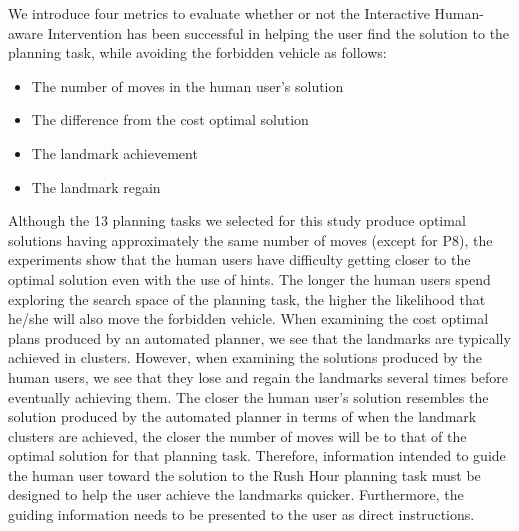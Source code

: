 We introduce four metrics to evaluate whether or not the Interactive Human-aware Intervention has been successful in helping the user find the solution to the planning task, while avoiding the forbidden vehicle as follows:
\begin{itemize}
\item The number of moves in the human user's solution
\item The difference from the cost optimal solution
\item The landmark achievement
\item The landmark regain
\end{itemize}
Although the 13 planning tasks we selected for this study produce optimal solutions having approximately the same number of moves (except for P8), the experiments show that the human users have difficulty getting closer to the optimal solution even with the use of hints.
The longer the human users spend exploring the search space of the planning task, the higher the likelihood that he/she will also move the forbidden vehicle.
When examining the cost optimal plans produced by an automated planner, we see that the landmarks are typically achieved in clusters.
However, when examining the solutions produced by the human users, we see that they lose and regain the landmarks several times before eventually achieving them.
The closer the human user's solution resembles the solution produced by the automated planner in terms of when the landmark clusters are achieved, the closer the number of moves will be to that of the optimal solution for that planning task.
Therefore, information intended to guide the human user toward the solution to the Rush Hour planning task must be designed to help the user achieve the landmarks quicker.
Furthermore, the guiding information needs to be presented to the user as direct instructions.

